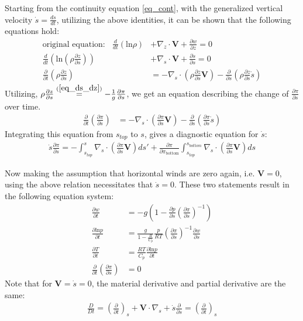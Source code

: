 Starting from the continuity equation \ref{eq_cont}, with the generalized vertical velocity $\dot{s}=\frac{ds}{dt}$, utilizing the above identities, it can be shown that the following equations hold:
\begin{align*}
\text{original equation:}~~~~ \frac{d}{dt}(\text{ln}\rho) &+ \nabla _z \cdot \textbf{V} + \frac{\partial w}{\partial z} = 0 \\
\frac{d}{dt}(\text{ln}(\rho\frac{\partial z}{\partial s})) &+ \nabla _s \cdot \textbf{V} + \frac{\partial \dot{s}}{\partial s} = 0\\
\frac{\partial}{\partial t}(\rho\frac{\partial z}{\partial s}) &= - \nabla _s \cdot (\rho\frac{\partial z}{\partial s}\textbf{V}) - \frac{\partial }{\partial s}(\rho\frac{\partial z}{\partial s}\dot{s})
\end{align*}
Utilizing, $\rho\frac{\partial z}{\partial s} \stackrel{(\ref{eq_ds_dz})}{=} - \frac{1}{g}\frac{\partial \pi}{\partial s}$, we get an equation describing the change of $\frac{\partial \pi}{\partial s}$ over time.
\begin{align*}
\frac{\partial}{\partial t}(\frac{\partial \pi}{\partial s}) &= - \nabla _s \cdot (\frac{\partial \pi}{\partial s}\textbf{V}) - \frac{\partial }{\partial s}(\frac{\partial \pi}{\partial s}\dot{s})
\end{align*}
Integrating this equation from $s_{top}$ to $s$, gives a diagnostic equation for $\dot{s}$:
\begin{align*}
\dot{s}\frac{\partial \pi}{\partial s} = -\int _{s_{top}}^s\nabla _s \cdot (\frac{\partial \pi}{\partial s}\textbf{V})ds' + \frac{\partial \pi}{\partial \pi_{\text{bottom}}} \int  _{s_{top}}^{s_{bottom}} \nabla _s \cdot (\frac{\partial \pi}{\partial s}\textbf{V}) ds
\end{align*}

Now making the assumption that horizontal winds are zero again, i.e. $\textbf{V}=0$, using the above relation necessitates that $\dot{s}=0$.
These two statements result in the following equation system:
\begin{align*}
\frac{\partial w}{\partial t} &= -g(1 - \frac{\partial p}{\partial s}(\frac{\partial \pi}{\partial s})^{-1}) \\
\frac{\partial \text{ln}p}{\partial t} &= \frac{g}{1- \frac{R}{C_p}} \frac{p}{RT}(\frac{\partial \pi}{\partial s})^{-1} \frac{\partial w}{\partial s}\\
\frac{\partial T}{\partial t} &= \frac{RT}{C_p}\frac{\partial \text{ln}p}{\partial t}\\
\frac{\partial}{\partial t}(\frac{\partial \pi}{\partial s}) &= 0
\end{align*}
Note that for $\textbf{V}=\dot{s}=0$, the material derivative and partial derivative are the same:
\begin{align*}
\frac{D}{Dt} = (\frac{\partial}{\partial t})_s + \textbf{V} \cdot \nabla _s + \dot{s}\frac{\partial }{\partial s} = (\frac{\partial}{\partial t})_s
\end{align*}

